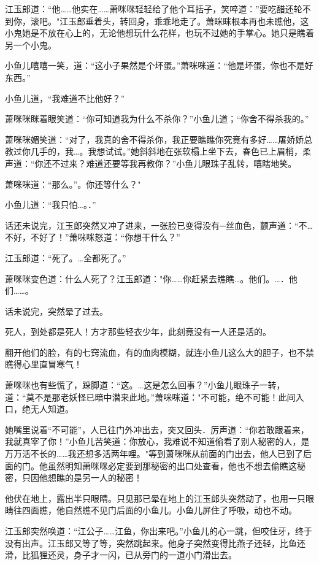 \documentclass[12pt,oneside]{book}
\begin{document}
江玉郎道：``他\ldots\ldots 他实在\ldots\ldots 萧咪咪轻轻给了他个耳括子，笑啐道：''要吃醋还轮不到你，滚吧。"江玉郎垂着头，转回身，乖乖地走了。萧眯眯根本再也未瞧他，这小鬼她是不放在心上的，无论他想玩什么花样，也玩不过她的手掌心。她只是瞧着另一个小鬼。

小鱼儿嘻嘻一笑，道：``这小子果然是个坏蛋。''萧咪咪道：``他是坏蛋，你也不是好东西。''

小鱼儿道，``我难道不比他好？''

萧咪咪眯着眼笑道：``你可知道我为什么不杀你？''小鱼儿道；``你舍不得杀我的。''

萧咪咪媚笑道：``对了，我真的舍不得杀你，我正要瞧瞧你究竟有多好\ldots\ldots 屠娇娇总教过你几手的，我\ldots。我想试试。''她斜斜地在张软榻上坐下去，春色已上眉梢，柔声道：``你还不过来？难道还要等我再教你？''小鱼儿眼珠子乱转，嘻瞎地笑。

萧咪咪道：``那么。''。你还等什么？"

小鱼儿道：``我只怕\ldots。．''

话还未说完，江玉郎突然又冲了进来，一张脸已变得没有─丝血色，颤声道：``不\ldots 不好，不好了！''萧咪咪怒道：``你想干什么？''

江玉郎道：``死了。\ldots 全都死了。''

萧咪咪变色道：什么人死了？江玉郎道："你\ldots\ldots 你赶紧去瞧瞧\ldots。他们。\ldots．他们\ldots\ldots。

话未说完，突然晕了过去。

死人，到处都是死人！方才那些轻衣少年，此刻竟没有一人还是活的。

翻开他们的脸，有的七窍流血，有的血肉模糊，就连小鱼儿这么大的胆子，也不禁瞧得心里直冒寒气！

萧咪咪也有些慌了，跺脚道：``这。\ldots 这是怎么回事？''小鱼儿眼珠子一转，道：``莫不是那老妖怪已暗中潜来此地。''萧咪咪道："不可能，绝不可能！此间入口，绝无人知道。

她嘴里说着``不可能''，人已往门外冲出去，突又回头．厉声道：``你若敢跟着来，我就真宰了你！''小鱼儿苦笑道：你放心，我难说不知道偷看了别人秘密的人，是万万活不长的\ldots\ldots 我还想多活两年哩。"等到萧咪咪从前面的门出去，他人已到了后面的门。他虽然明知萧咪咪必定要到那秘密的出口处查看，他也不想去偷瞧这秘密，只因他想瞧的是另一人的秘密！

他伏在地上，露出半只眼睛。只见那已晕在地上的江玉郎头突然动了，也用一只眼睛往四面瞧，他自然瞧不见门后面的小鱼儿。小鱼儿屏住了呼吸，动也不动。

江玉郎突然唤道：``江公子\ldots\ldots 江鱼，你出来吧。''小鱼儿的心一跳，但咬住牙，终于没有出声。江玉郎又等了等，突然跳起来。他身子突然变得比燕子还轻，比鱼还滑，比狐狸还灵，身子才一闪，已从旁门的一道小门滑出去。
\end{document}

